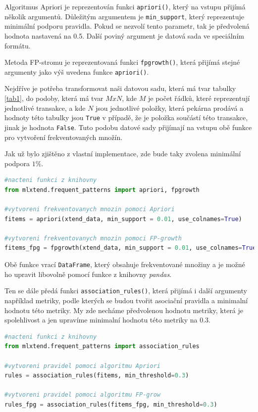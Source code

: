 Algoritmus Apriori je reprezentován funkci \verb|apriori()|, který na vstupu přijímá několik argumentů. Důležitým argumentem je \verb|min_support|, který reprezentuje minimální podporu pravidla. Pokud se nezvolí tento parametr, tak je předvolená hodnota nastavená na 0.5. Další poviný argument je datová sada ve speciálním formátu. 

Metoda FP-stromu je reprezentovaná funkci \verb|fpgrowth()|, která přijímá stejné argumenty jako výš uvedena funkce \verb|apriori()|. 

Nejdříve je potřeba transformovat naši datovou sadu, která má tvar tabulky \ref{tab1}, do podoby, která má tvar $MxN$, kde $M$ je počet řádků, které reprezentují jednotlivé transakce, a kde $N$ jsou jednotlivé položky, která pekárna prodává a hodnoty této tabulky jsou \verb|True| v případě, že je položka součástí této transakce, jinak je hodnota \verb|False|. Tuto podobu datové sady přijímají na vstupu obě funkce pro vytvoření frekventovaných množín.

Jak už bylo zjištěno z vlastní implementace, zde bude taky zvolena minimální podpora $1\%$.
\begin{mdframed}
\begin{lstlisting}[language=Python]
#nacteni funkci z knihovny
from mlxtend.frequent_patterns import apriori, fpgrowth

#vytvoreni frekventovanych mnozin pomoci Apriori
fitems = apriori(xtend_data, min_support = 0.01, use_colnames=True)

#vytvoreni frekventovanych mnozin pomoci FP-growth
fitems_fpg = fpgrowth(xtend_data, min_support = 0.01, use_colnames=True)
\end{lstlisting}   
\end{mdframed}

Obě funkce vrací \verb|DataFrame|, který obsahuje frekventované množiny a je možné ho upravit libovolně pomocí funkce z knihovny \textit{pandas}.

Ten se dále předá funkci \verb|association_rules()|, která přijímá i další argumenty například metriky, podle kterých se budou tvořit asociační pravidla a minimalní hodnotu této metriky. My zde necháme předvolenou hodnotu metriky, která je spolehlivost a jen upravíme minimalní hodnotu této metriky na 0.3.

\begin{mdframed}
\begin{lstlisting}[language=Python]
#nacteni funkci z knihovny
from mlxtend.frequent_patterns import association_rules

#vytvoreni pravidel pomoci algoritmu Apriori
rules = association_rules(fitems, min_threshold=0.3)

#vytvoreni pravidel pomoci algoritmu FP-grow
rules_fpg = association_rules(fitems_fpg, min_threshold=0.3)
\end{lstlisting}   
\end{mdframed}


